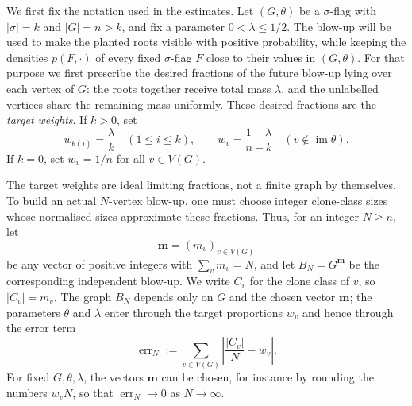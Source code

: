 \documentclass[11pt]{article}
\theoremstyle{definition}
\begin{document}
We first fix the notation used in the estimates.  Let $(G,\theta)$ be a
$\sigma$-flag with $|\sigma|=k$ and $|G|=n>k$, and fix a parameter
$0<\lambda\le 1/2$.  The blow-up will be used to make the planted roots
visible with positive probability, while keeping the densities
$p(F,\cdot)$ of every fixed $\sigma$-flag $F$ close to their values in
$(G,\theta)$.  For that purpose we first prescribe the desired
fractions of the future blow-up lying over each vertex of $G$: the roots
together receive total mass $\lambda$, and the unlabelled vertices
share the remaining mass uniformly.  These desired fractions are the
\emph{target weights}.  If $k>0$, set
\[
  w_{\theta(i)}=\frac{\lambda}{k}\quad(1\le i\le k),
  \qquad
  w_v=\frac{1-\lambda}{n-k}\quad(v\notin\operatorname{im}\theta).
\]
If $k=0$, set $w_v=1/n$ for all $v\in V(G)$.

The target weights are ideal limiting fractions, not a finite graph by
themselves.  To build an actual $N$-vertex blow-up, one must choose integer
clone-class sizes whose normalised sizes approximate these fractions.  Thus, for
an integer $N\ge n$, let
\[
  \mathbf m=(m_v)_{v\in V(G)}
\]
be any vector of positive integers with $\sum_v m_v=N$, and let
$B_N=G^{\mathbf m}$ be the corresponding independent blow-up.  We write $C_v$
for the clone class of $v$, so $|C_v|=m_v$.  The graph $B_N$ depends only on
$G$ and the chosen vector $\mathbf m$; the parameters $\theta$ and $\lambda$
enter through the target proportions $w_v$ and hence through the error term
\[
  \operatorname{err}_N
  :=
  \sum_{v\in V(G)}\left|\frac{|C_v|}{N}-w_v\right|.
\]
For fixed $G,\theta,\lambda$, the vectors $\mathbf m$ can be chosen, for
instance by rounding the numbers $w_vN$, so that
$\operatorname{err}_N\to0$ as $N\to\infty$.
\end{document}
